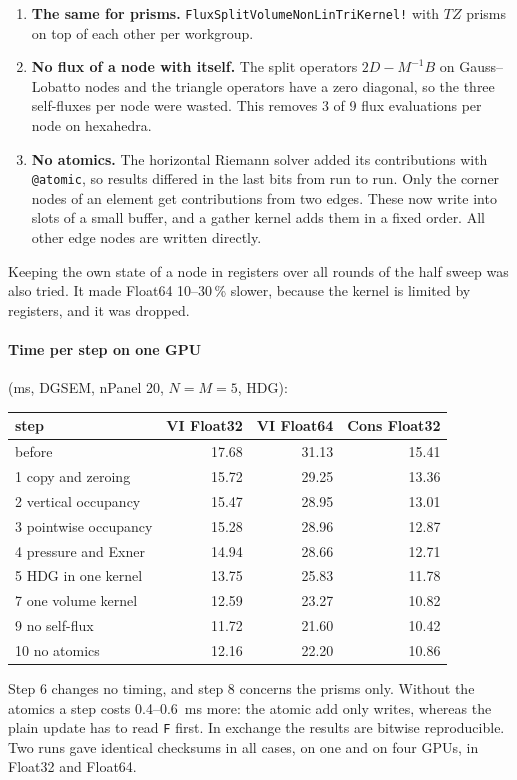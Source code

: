 \documentclass[11pt,a4paper]{article}
\newcommand{\code}[1]{\texttt{#1}}
\begin{document}
\begin{enumerate}
  once, keeps $S+A$ and passes $S-A$ to its partner through shared memory.
\item \textbf{The same for prisms.} \code{FluxSplitVolumeNonLinTriKernel!}
  with $TZ$ prisms on top of each other per workgroup.
\item \textbf{No flux of a node with itself.} The split operators
  $2D-M^{-1}B$ on Gauss--Lobatto nodes and the triangle operators have a
  zero diagonal, so the three self-fluxes per node were wasted. This
  removes 3 of 9 flux evaluations per node on hexahedra.
\item \textbf{No atomics.} The horizontal Riemann solver added its
  contributions with \code{@atomic}, so results differed in the last bits
  from run to run. Only the corner nodes of an element get contributions
  from two edges. These now write into slots of a small buffer, and a
  gather kernel adds them in a fixed order. All other edge nodes are
  written directly.
\end{enumerate}

Keeping the own state of a node in registers over all rounds of the
half sweep was also tried. It made Float64 10--30\,\% slower, because the
kernel is limited by registers, and it was dropped.

\paragraph{Time per step on one GPU} (ms, DGSEM, nPanel 20,
$N=M=5$, HDG):
\begin{center}
\small
\begin{tabular}{lrrr}
\toprule
step & VI Float32 & VI Float64 & Cons Float32 \\
\midrule
before               & 17.68 & 31.13 & 15.41 \\
1 copy and zeroing   & 15.72 & 29.25 & 13.36 \\
2 vertical occupancy & 15.47 & 28.95 & 13.01 \\
3 pointwise occupancy& 15.28 & 28.96 & 12.87 \\
4 pressure and Exner & 14.94 & 28.66 & 12.71 \\
5 HDG in one kernel  & 13.75 & 25.83 & 11.78 \\
7 one volume kernel  & 12.59 & 23.27 & 10.82 \\
9 no self-flux       & 11.72 & 21.60 & 10.42 \\
10 no atomics        & 12.16 & 22.20 & 10.86 \\
\bottomrule
\end{tabular}
\end{center}
Step 6 changes no timing, and step 8 concerns the prisms only. Without
the atomics a step costs 0.4--0.6~ms more: the atomic add only writes,
whereas the plain update has to read \code{F} first. In exchange the
results are bitwise reproducible. Two runs gave identical checksums in
all cases, on one and on four GPUs, in Float32 and Float64.
\end{document}
